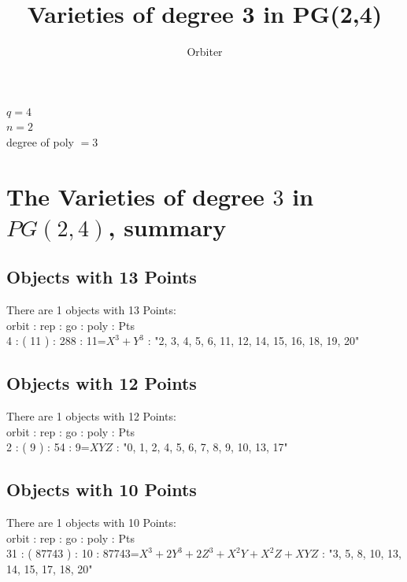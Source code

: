 \documentclass[12pt]{article}
\newcommand\setTBstruts{\def\T{\rule{0pt}{2.6ex}}%
\def\B{\rule[-1.2ex]{0pt}{0pt}}}
\begin{document}
 
\setTBstruts



{\allowdisplaybreaks%






\title{Varieties of degree 3 in PG(2,4)}
\author{Orbiter}%
\maketitle%
%



\small
\arraycolsep=2pt
\parindent=0pt
$q = 4$\\
$n = 2$\\
degree of poly $ = 3$\\
\clearpage

\section*{The Varieties of degree $3$ in $PG(2, 4)$, summary}
\subsection*{Objects with 13 Points}
There are 1 objects with 13 Points: \\
orbit : rep : go : poly : Pts\\
4 : ( 11 ) : 288 : 11=$X^3 + Y^3$ : "2, 3, 4, 5, 6, 11, 12, 14, 15, 16, 18, 19, 20"\\
\subsection*{Objects with 12 Points}
There are 1 objects with 12 Points: \\
orbit : rep : go : poly : Pts\\
2 : ( 9 ) : 54 : 9=$XYZ$ : "0, 1, 2, 4, 5, 6, 7, 8, 9, 10, 13, 17"\\
\subsection*{Objects with 10 Points}
There are 1 objects with 10 Points: \\
orbit : rep : go : poly : Pts\\
31 : ( 87743 ) : 10 : 87743=$X^3 + 2Y^3 + 2Z^3 + X^2Y + X^2Z + XYZ$ : "3, 5, 8, 10, 13, 14, 15, 17, 18, 20"\\
}
\end{document}
